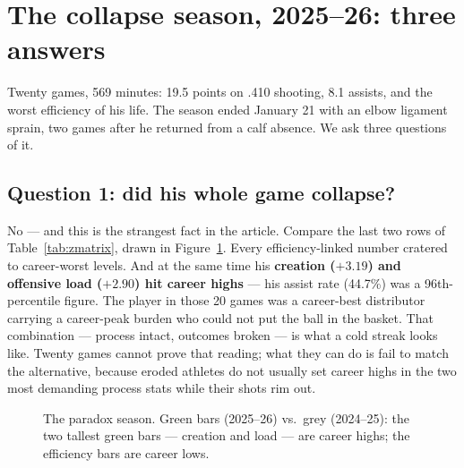 \documentclass[11pt]{article}
\begin{document}
\section{The collapse season, 2025--26: three answers}
\label{sec:collapse}

Twenty games, 569 minutes: 19.5 points on .410 shooting, 8.1 assists, and the worst
efficiency of his life. The season ended January 21 with an elbow ligament sprain, two
games after he returned from a calf absence. We ask three questions of it.

\subsection{Question 1: did his whole game collapse?}

No --- and this is the strangest fact in the article. Compare the last two rows of
Table~\ref{tab:zmatrix}, drawn in Figure~\ref{fig:dumbbell}. Every efficiency-linked
number cratered to career-worst levels. And at the same time his \textbf{creation
($+3.19$) and offensive load ($+2.90$) hit career highs} --- his assist rate (44.7\%) was
a 96th-percentile figure. The player in those 20 games was a career-best distributor
carrying a career-peak burden who could not put the ball in the basket. That
combination --- process intact, outcomes broken --- is what a cold streak looks like.
Twenty games cannot prove that reading; what they can do is fail to match the
alternative, because eroded athletes do not usually set career highs in the two most
demanding process stats while their shots rim out.

\begin{figure}[h]
\centering
{}
\caption{The paradox season. Green bars (2025--26) vs.\ grey (2024--25): the two tallest
green bars --- creation and load --- are career highs; the efficiency bars are career lows.}
\label{fig:dumbbell}
\end{figure}
\end{document}

